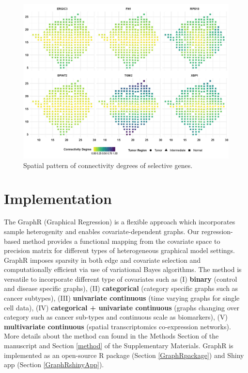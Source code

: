 \documentclass[
]{book}
\begin{document}
\begin{figure}

{\centering \includegraphics[width=0.7\linewidth]{images/supp_degree} 

}

\caption{Spatial pattern of connectivity degrees of selective genes.}\label{fig:STdegreeloc}
\end{figure}

\hypertarget{ImplementGraphR}{%
\chapter{Implementation}\label{ImplementGraphR}}

The GraphR (Graphical Regression) is a flexible approach which incorporates sample heterogenity and enables covariate-dependent graphs. Our regression-based method provides a functional mapping from the covariate space to precision matrix for different types of heterogeneous graphical model settings. GraphR imposes sparsity in both edge and covariate selection and computationally efficient via use of variational Bayes algorithms. The method is versatile to incorporate different type of covariates such as
(I) \textbf{binary} (control and disease specific graphs),
(II) \textbf{categorical} (category specific graphs such as cancer subtypes),
(III) \textbf{univariate continuous} (time varying graphs for single cell data),
(IV) \textbf{categorical + univariate continuous} (graphs changing over category such as cancer sub-types and continuous scale as biomarkers),
(V) \textbf{multivariate continuous} (spatial transcriptomics co-expression networks).
More details about the method can found in the Methods Section of the manuscript and Section \ref{method} of the Supplementary Materials. GraphR is implemented as an open-source R package (Section \ref{GraphRpackage}) and Shiny app (Section \ref{GraphRshinyApp}).
\end{document}
